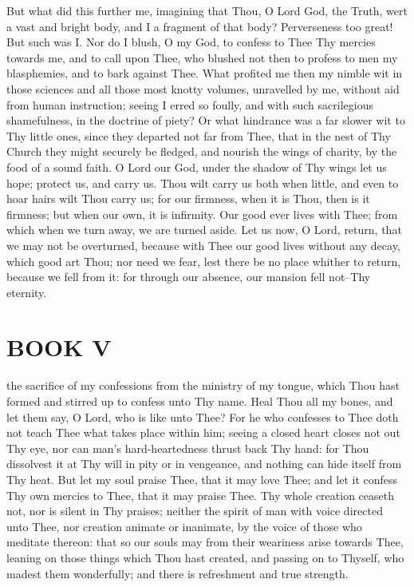 \documentclass[b5paper,openright,12pt,twoside]{book}
\begin{document}
But what did this further me, imagining that Thou, O Lord God, the
Truth, wert a vast and bright body, and I a fragment of that body?
Perverseness too great! But such was I. Nor do I blush, O my God, to
confess to Thee Thy mercies towards me, and to call upon Thee, who
blushed not then to profess to men my blasphemies, and to bark against
Thee. What profited me then my nimble wit in those sciences and all
those most knotty volumes, unravelled by me, without aid from human
instruction; seeing I erred so foully, and with such sacrilegious
shamefulness, in the doctrine of piety? Or what hindrance was a far
slower wit to Thy little ones, since they departed not far from Thee,
that in the nest of Thy Church they might securely be fledged, and
nourish the wings of charity, by the food of a sound faith. O Lord our
God, under the shadow of Thy wings let us hope; protect us, and carry
us. Thou wilt carry us both when little, and even to hoar hairs wilt
Thou carry us; for our firmness, when it is Thou, then is it firmness;
but when our own, it is infirmity. Our good ever lives with Thee;
from which when we turn away, we are turned aside. Let us now, O Lord,
return, that we may not be overturned, because with Thee our good lives
without any decay, which good art Thou; nor need we fear, lest there
be no place whither to return, because we fell from it: for through our
absence, our mansion fell not--Thy eternity.




\chapter{BOOK V}


 the sacrifice of my confessions from the ministry of my tongue,
which Thou hast formed and stirred up to confess unto Thy name. Heal
Thou all my bones, and let them say, O Lord, who is like unto Thee? For
he who confesses to Thee doth not teach Thee what takes place within
him; seeing a closed heart closes not out Thy eye, nor can man's
hard-heartedness thrust back Thy hand: for Thou dissolvest it at Thy
will in pity or in vengeance, and nothing can hide itself from Thy heat.
But let my soul praise Thee, that it may love Thee; and let it confess
Thy own mercies to Thee, that it may praise Thee. Thy whole creation
ceaseth not, nor is silent in Thy praises; neither the spirit of man
with voice directed unto Thee, nor creation animate or inanimate, by the
voice of those who meditate thereon: that so our souls may from their
weariness arise towards Thee, leaning on those things which Thou hast
created, and passing on to Thyself, who madest them wonderfully; and
there is refreshment and true strength.
\end{document}
